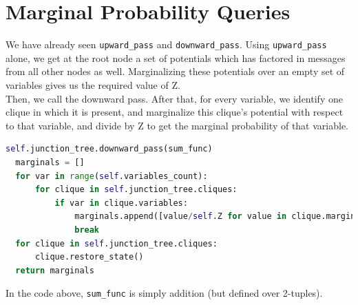 \documentclass{article}
\begin{document}
\section{Marginal Probability Queries}
We have already seen \texttt{upward\_pass} and \texttt{downward\_pass}. Using \texttt{upward\_pass} alone, we get at the root node a set of potentials which has factored in messages from all other nodes as well. Marginalizing these potentials over an empty set of variables gives us the required value of Z.\\
Then, we call the downward pass. After that, for every variable, we identify one clique in which it is present, and marginalize this clique's potential with respect to that variable, and divide by Z to get the marginal probability of that variable.\\
\begin{lstlisting}[language=Python]
  self.junction_tree.downward_pass(sum_func)
  marginals = []
  for var in range(self.variables_count):
      for clique in self.junction_tree.cliques:
          if var in clique.variables:
              marginals.append([value/self.Z for value in clique.marginalize({var}, sum_func)])
              break
  for clique in self.junction_tree.cliques:
      clique.restore_state()
  return marginals
\end{lstlisting}
In the code above, \texttt{sum\_func} is simply addition (but defined over 2-tuples).
\end{document}
